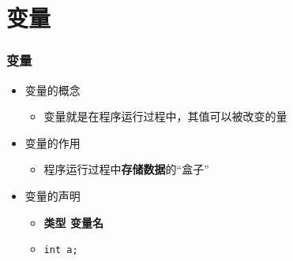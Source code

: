 \section{变量}

\begin{frame}[fragile]
    \frametitle{变量}

    \begin{itemize}
        \item<1-> 变量的概念

            \begin{itemize}
                \item 变量就是在程序运行过程中，其值可以被改变的量
            \end{itemize}

        \item<2-> 变量的作用

            \begin{itemize}
                \item 程序运行过程中\textbf{存储数据}的“盒子”
            \end{itemize}

        \item<3-> 变量的声明

            \begin{itemize}
                \item \textbf{类型 \enspace 变量名}
                \item \lstinline|int a;|
            \end{itemize}

    \end{itemize}
\end{frame}

